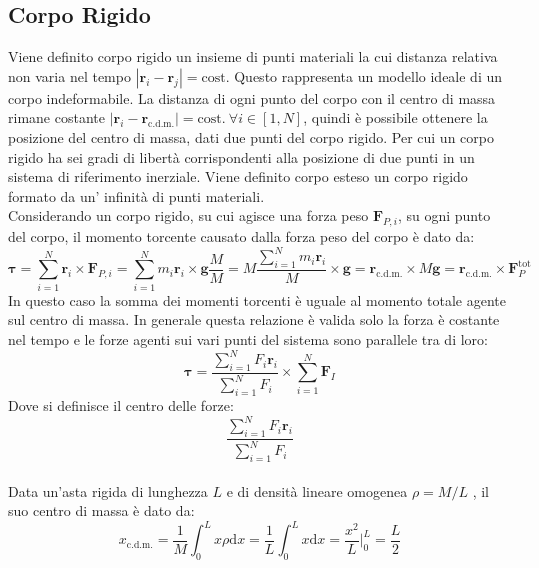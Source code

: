\documentclass{article}
\newcommand{\vect}[1]{\boldsymbol{\mathbf{#1}}}
\newcommand{\df}{\mathrm{d}}
\numberwithin{equation}{subsection}
\begin{document}
\subsection{Corpo Rigido}

Viene definito corpo rigido un insieme di punti materiali la 
cui distanza relativa non varia nel tempo $|\vect{r}_i-\vect{r}_j|=\mathrm{cost.}$ Questo rappresenta un modello ideale di un corpo indeformabile. 
La distanza di ogni punto del corpo con il centro di massa 
rimane costante $|\vect{r}_i-\vect{r}_{\mathrm{c.d.m.}}|=\mathrm{cost.}\:\forall i\in[1,N]$, quindi è possibile ottenere la posizione 
del centro di massa, dati due punti del corpo rigido. Per cui un 
corpo rigido ha sei gradi di libertà corrispondenti alla posizione di due punti in un sistema di riferimento inerziale.  
Viene definito corpo esteso un corpo rigido formato da un'
infinità di punti materiali. 
\\
Considerando un corpo rigido, su cui agisce una forza peso $\vect{F}_{{P,i}}$, 
su ogni punto del corpo, il momento torcente causato dalla forza 
peso del corpo è dato da: 
\begin{equation*}
    \vect{\tau}=\displaystyle\sum_{i=1}^{N}\vect{r}_i\times\vect{F}_{P,i}=
    \displaystyle\sum_{i=1}^{N}m_i\vect{r}_i\times\vect{g}\frac{M}{M}=
    M\displaystyle\frac{\sum_{i=1}^{N}m_i\vect{r}_i}{M}\times\vect{g}=
    \vect{r}_{\mathrm{c.d.m.}}\times M\vect{g}=
    \vect{r}_{\mathrm{c.d.m.}}\times \vect{F}_P^\mathrm{tot}
\end{equation*}
In questo caso la somma dei momenti torcenti è uguale al 
momento totale agente sul centro di massa. In generale questa 
relazione è valida solo la forza è costante nel tempo e le 
forze agenti sui vari punti del sistema sono parallele tra di loro: 
\begin{equation}
    \vect{\tau}=\displaystyle\frac{\sum_{i=1}^{N}F_i\vect{r}_i}{\sum_{i=1}^{N}F_i}\times\sum_{i=1}^{N}\vect{F}_I
\end{equation}
Dove si definisce il centro delle forze:
\begin{equation*}
    \displaystyle\frac{\sum_{i=1}^{N}F_i\vect{r}_i}{\sum_{i=1}^{N}F_i}
\end{equation*}
\\
Data un'asta rigida di lunghezza $L$ e di densità lineare omogenea $\rho={M}/{L}$ , 
il suo centro di massa è dato da:
\begin{equation*}
    x_{\mathrm{c.d.m.}}=\displaystyle\frac{1}{M}\int_{0}^{L}x\rho \df x=\frac{1}{L}\int_{0}^{L}x\df x=\frac{x^2}{L}\Bigg|_0^L=\frac{L}{2} 
\end{equation*}
\end{document}
